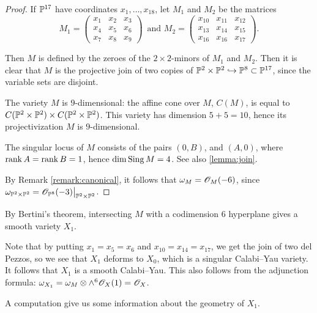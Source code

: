 \begin{proof}
If $\P^{17}$ have coordinates $x_1,\ldots,x_{18}$, let $M_1$ and $M_2$ be the matrices
\[
M_1 = \begin{pmatrix}
x_1 & x_2 & x_3 \\
x_4 & x_5 & x_6 \\
x_7 & x_8 & x_9 
\end{pmatrix}\,
\text{ and }
M_2 = \begin{pmatrix}
x_{10} & x_{11} & x_{12} \\
x_{13} & x_{14} & x_{15} \\
x_{16} & x_{16} & x_{17}
\end{pmatrix}.
\]

Then $M$ is defined by the zeroes of the $2 \times 2$-minors of $M_1$ and $M_2$. Then it is clear that $M$ is the projective join of two copies of $\mathbb P^2 \times \mathbb P^2 \hookrightarrow \mathbb P^8 \subset \P^{17}$, since the variable sets are disjoint.

The variety $M$ is $9$-dimensional: the affine cone over $M$, $C(M)$, is equal to $C(\mathbb P^2 \times \P^2) \times C(\mathbb P^2 \times \P^2)$. This variety has dimension $5+5=10$, hence its projectivization $M$ is $9$-dimensional. 

The singular locus of $M$ consists of the pairs $(0,B)$, and $(A,0)$, where $\rank A= \rank B = 1$, hence $\dim \Sing M = 4$. See also \cref{lemma:join}.

By Remark \ref{remark:canonical}, it follows that $\omega_M = \OO_M(-6)$, since $\omega_{\P^2 \times \P^2} = \restr{\OO_{\P^8}(-3)}{\P^2 \times \P^2}$.
\end{proof}

By Bertini's theorem, intersecting $M$ with a codimension $6$ hyperplane gives a smooth variety $X_1$.

Note that by putting $x_1=x_5=x_6$ and $x_{10}=x_{14}=x_{17}$, we get the join of two del Pezzos, so we see that $X_1$ deforms to $X_0$, which is a singular Calabi--Yau variety. It follows that $X_1$ is a smooth Calabi--Yau. This also follows from the adjunction formula: $\omega_{X_1} = \omega_M \otimes \wedge^6 \OO_X(1) = \OO_X$.

A \MM computation give us some information about the geometry of $X_1$.

